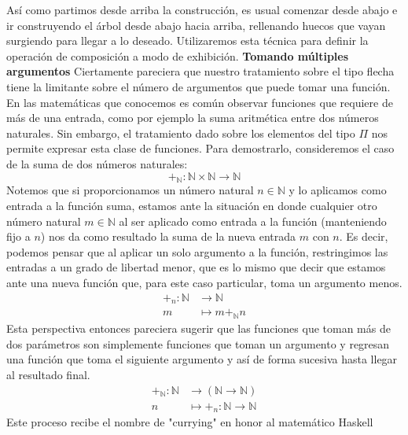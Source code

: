 \documentclass{article}
\begin{document}
    Así como partimos desde arriba la construcción, es usual comenzar desde
    abajo e ir construyendo el árbol desde abajo hacia arriba, rellenando huecos
    que vayan surgiendo para llegar a lo deseado. Utilizaremos esta técnica para
    definir la operación de composición a modo de exhibición.\newline\newline
    \textbf{Tomando múltiples argumentos}\newline\newline
    Ciertamente pareciera que nuestro tratamiento sobre el tipo flecha tiene la
    limitante sobre el número de argumentos que puede tomar una función. En las
    matemáticas que conocemos es común observar funciones que requiere de más de
    una entrada, como por ejemplo la suma aritmética entre dos números
    naturales. Sin embargo, el tratamiento dado sobre los elementos del tipo
    $\Pi$ nos permite expresar esta clase de funciones. Para demostrarlo,
    consideremos el caso de la suma de dos números naturales:
    $$
        +_{\mathbb{N}} : \mathbb{N} \times \mathbb{N} \rightarrow \mathbb{N}
    $$
    Notemos que si proporcionamos un número natural $n \in \mathbb{N}$ y lo 
    aplicamos como entrada a la función suma, estamos ante la situación en
    donde cualquier otro número natural $m \in \mathbb{N}$ al ser aplicado como
    entrada a la función (manteniendo fijo a $n$) nos da como resultado la suma
    de la nueva entrada $m$ con $n$. Es decir, podemos pensar que al aplicar un
    solo argumento a la función, restringimos las entradas a un grado de
    libertad menor, que es lo mismo que decir que estamos ante una nueva función
    que, para este caso particular, toma un argumento menos.
    \begin{align*}
        +_{n} : \mathbb{N} &\rightarrow \mathbb{N}\\
        m &\mapsto m +_{\mathbb{N}} n
    \end{align*}
    Esta perspectiva entonces pareciera sugerir que las funciones que toman más
    de dos parámetros son simplemente funciones que toman un argumento y 
    regresan una función que toma el siguiente argumento y así de forma
    sucesiva hasta llegar al resultado final.
    \begin{align*}
        +_\mathbb{N} : \mathbb{N} &\rightarrow (\mathbb{N} \rightarrow \mathbb{N})\\
        n &\mapsto +_n : \mathbb{N} \rightarrow \mathbb{N}
    \end{align*}
    Este proceso recibe el nombre de "currying" en honor al matemático Haskell 
\end{document}
